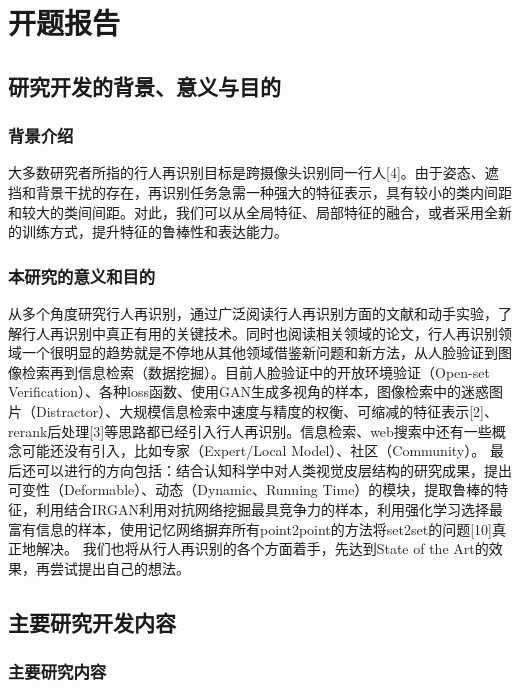 \chapter{开题报告}

\section{研究开发的背景、意义与目的}

\subsection{背景介绍}

大多数研究者所指的行人再识别目标是跨摄像头识别同一行人[4]。由于姿态、遮挡和背景干扰的存在，再识别任务急需一种强大的特征表示，具有较小的类内间距和较大的类间间距。对此，我们可以从全局特征、局部特征的融合，或者采用全新的训练方式，提升特征的鲁棒性和表达能力。

\subsection{本研究的意义和目的}

从多个角度研究行人再识别，通过广泛阅读行人再识别方面的文献和动手实验，了解行人再识别中真正有用的关键技术。同时也阅读相关领域的论文，行人再识别领域一个很明显的趋势就是不停地从其他领域借鉴新问题和新方法，从人脸验证到图像检索再到信息检索（数据挖掘）。目前人脸验证中的开放环境验证（Open-set Verification）、各种loss函数、使用GAN生成多视角的样本，图像检索中的迷惑图片（Distractor）、大规模信息检索中速度与精度的权衡、可缩减的特征表示[2]、rerank后处理[3]等思路都已经引入行人再识别。信息检索、web搜索中还有一些概念可能还没有引入，比如专家（Expert/Local Model）、社区（Community）。
最后还可以进行的方向包括：结合认知科学中对人类视觉皮层结构的研究成果，提出可变性（Deformable）、动态（Dynamic、Running Time）的模块，提取鲁棒的特征，利用结合IRGAN利用对抗网络挖掘最具竞争力的样本，利用强化学习选择最富有信息的样本，使用记忆网络摒弃所有point2point的方法将set2set的问题[10]真正地解决。
我们也将从行人再识别的各个方面着手，先达到State of the Art的效果，再尝试提出自己的想法。

\section{主要研究开发内容}

\subsection{主要研究内容}

